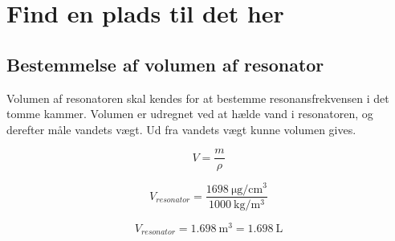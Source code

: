 \chapter{Find en plads til det her}

\section{Bestemmelse af volumen af resonator}

Volumen af resonatoren skal kendes for at bestemme resonansfrekvensen i det tomme kammer. Volumen er udregnet ved at hælde vand i resonatoren, og derefter måle vandets vægt. Ud fra vandets vægt kunne volumen gives. 

\begin{equation}
  V=\frac{m}{\rho}
\end{equation}

\begin{equation}
V_{resonator}=\frac{\SI{1698}{\micro\gram \per \centi\meter^{3}}}{\SI{1000}{\kilo \gram \per \meter^{3}}}
\end{equation}

\begin{equation}
	V_{resonator}={\SI{1.698}{\meter^{3}}}={\SI{1.698}{\liter}}
\end{equation}